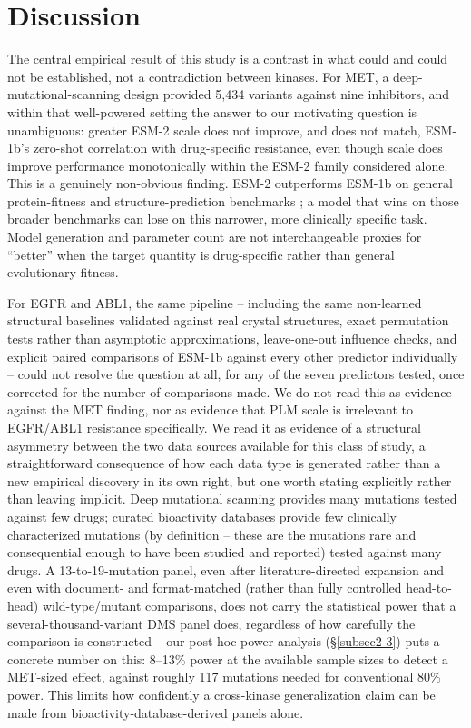 \documentclass[pdflatex,sn-mathphys-num]{sn-jnl}%
\theoremstyle{thmstyleone}%
\theoremstyle{thmstyletwo}%
\theoremstyle{thmstylethree}%
\begin{document}
\section{Discussion}\label{sec4}

The central empirical result of this study is a contrast in what could and could not be established, not a contradiction between kinases. For MET, a deep-mutational-scanning design provided 5{,}434 variants against nine inhibitors, and within that well-powered setting the answer to our motivating question is unambiguous: greater ESM-2 scale does not improve, and does not match, ESM-1b's zero-shot correlation with drug-specific resistance, even though scale does improve performance monotonically within the ESM-2 family considered alone. This is a genuinely non-obvious finding. ESM-2 outperforms ESM-1b on general protein-fitness and structure-prediction benchmarks \citep{Lin2023}; a model that wins on those broader benchmarks can lose on this narrower, more clinically specific task. Model generation and parameter count are not interchangeable proxies for ``better'' when the target quantity is drug-specific rather than general evolutionary fitness.

For EGFR and ABL1, the same pipeline -- including the same non-learned structural baselines validated against real crystal structures, exact permutation tests rather than asymptotic approximations, leave-one-out influence checks, and explicit paired comparisons of ESM-1b against every other predictor individually -- could not resolve the question at all, for any of the seven predictors tested, once corrected for the number of comparisons made. We do not read this as evidence against the MET finding, nor as evidence that PLM scale is irrelevant to EGFR/ABL1 resistance specifically. We read it as evidence of a structural asymmetry between the two data sources available for this class of study, a straightforward consequence of how each data type is generated rather than a new empirical discovery in its own right, but one worth stating explicitly rather than leaving implicit. Deep mutational scanning provides many mutations tested against few drugs; curated bioactivity databases provide few clinically characterized mutations (by definition -- these are the mutations rare and consequential enough to have been studied and reported) tested against many drugs. A 13-to-19-mutation panel, even after literature-directed expansion and even with document- and format-matched (rather than fully controlled head-to-head) wild-type/mutant comparisons, does not carry the statistical power that a several-thousand-variant DMS panel does, regardless of how carefully the comparison is constructed -- our post-hoc power analysis (\S\ref{subsec2-3}) puts a concrete number on this: 8--13\% power at the available sample sizes to detect a MET-sized effect, against roughly 117 mutations needed for conventional 80\% power. This limits how confidently a cross-kinase generalization claim can be made from bioactivity-database-derived panels alone.
\end{document}
